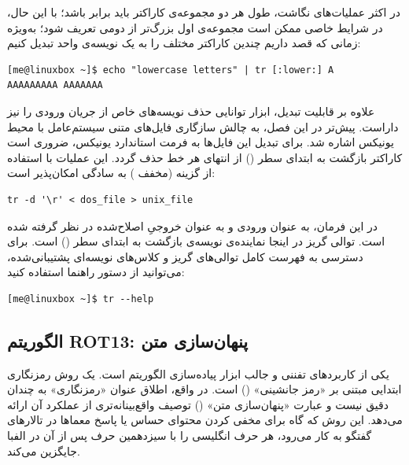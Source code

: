 در اکثر عملیات‌های نگاشت، طول هر دو مجموعه‌ی کاراکتر باید برابر باشد؛ با این حال، در شرایط خاصی ممکن است مجموعه‌ی اول بزرگ‌تر از دومی تعریف شود؛ به‌ویژه زمانی که قصد داریم چندین کاراکتر مختلف را به یک نویسه‌ی واحد تبدیل کنیم:

\begin{latin}
\begin{lstlisting}
[me@linuxbox ~]$ echo "lowercase letters" | tr [:lower:] A
AAAAAAAAA AAAAAAA
\end{lstlisting}
\end{latin}

علاوه بر قابلیت تبدیل، ابزار  توانایی حذف نویسه‌های خاص از جریان ورودی را نیز داراست. پیش‌تر در این فصل، به چالش سازگاری فایل‌های متنی سیستم‌عامل  با محیط یونیکس اشاره شد. برای تبدیل این فایل‌ها به فرمت استاندارد یونیکس، ضروری است کاراکتر بازگشت به ابتدای سطر () از انتهای هر خط حذف گردد. این عملیات با استفاده از گزینه  (مخفف ) به سادگی امکان‌پذیر است:

\begin{latin}
\begin{lstlisting}
tr -d '\r' < dos_file > unix_file
\end{lstlisting}
\end{latin}

در این فرمان،  به عنوان ورودی و  به عنوان خروجیِ اصلاح‌شده در نظر گرفته شده است. توالی گریز  در اینجا نماینده‌ی نویسه‌ی بازگشت به ابتدای سطر () است. برای دسترسی به فهرست کامل توالی‌های گریز و کلاس‌های نویسه‌ای پشتیبانی‌شده، می‌توانید از دستور راهنما استفاده کنید:

\begin{latin}
\begin{lstlisting}
[me@linuxbox ~]$ tr --help
\end{lstlisting}
\end{latin}

\subsection{الگوریتم ROT13: پنهان‌سازی متن}

یکی از کاربردهای تفننی و جالب ابزار  پیاده‌سازی الگوریتم  است.  یک روش رمزنگاری ابتدایی مبتنی بر «رمز جانشینی» () است. در واقع، اطلاق عنوان «رمزنگاری» به  چندان دقیق نیست و عبارت «پنهان‌سازی متن» () توصیف واقع‌بینانه‌تری از عملکرد آن ارائه می‌دهد. این روش که گاه برای مخفی کردن محتوای حساس یا پاسخ معماها در تالارهای گفتگو به کار می‌رود، هر حرف انگلیسی را با سیزدهمین حرف پس از آن در الفبا جایگزین می‌کند.


